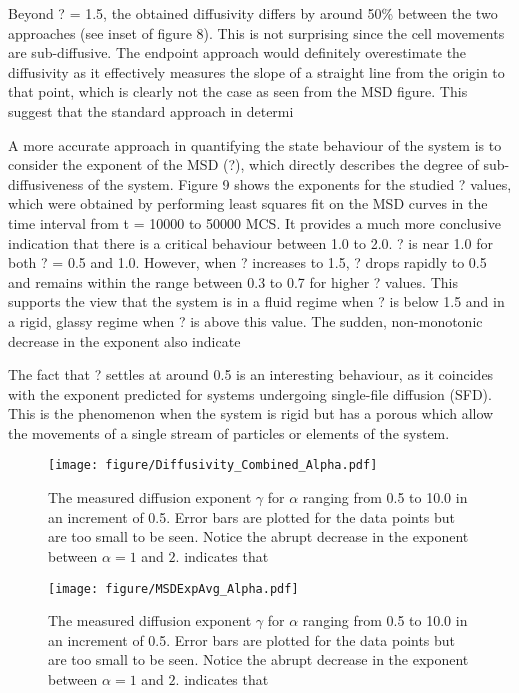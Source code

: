 \documentclass[a4paper,12pt]{article}
\begin{document}
Beyond ? = 1.5, the obtained diffusivity differs by around 50\% between the two approaches (see inset of figure 8). This is not surprising since the cell movements are sub-diffusive. The endpoint approach would definitely overestimate the diffusivity as it effectively measures the slope of a straight line from the origin to that point, which is clearly not the case as seen from the MSD figure. This suggest that the standard approach in determi

A more accurate approach in quantifying the state behaviour of the system is to consider the exponent of the MSD (?), which directly describes the degree of sub-diffusiveness of the system. Figure 9 shows the exponents for the studied ? values, which were obtained by performing least squares fit on the MSD curves in the time interval from t = 10000 to 50000 MCS. It provides a much more conclusive indication that there is a critical behaviour between 1.0 to 2.0. ? is near 1.0 for both ? = 0.5 and 1.0. However, when ? increases to 1.5, ? drops rapidly to 0.5 and remains within the range between 0.3 to 0.7 for higher ? values. This supports the view that the system is in a fluid regime when ? is below 1.5 and in a rigid, glassy regime when ? is above this value. The sudden, non-monotonic decrease in the exponent also indicate 

The fact that ? settles at around 0.5 is an interesting behaviour, as it coincides with the exponent predicted for systems undergoing single-file diffusion (SFD). This is the phenomenon when the system is rigid but has a porous which allow the movements of a single stream of particles or elements of the system. 
\begin{figure}[h]
\centering
\texttt{[image: figure/Diffusivity\_Combined\_Alpha.pdf]}
\caption{The measured diffusion exponent $\gamma$ for $\alpha$ ranging from 0.5 to 10.0 in an increment of 0.5. Error bars are plotted for the data points but are too small to be seen. Notice the abrupt decrease in the exponent between $\alpha = 1$ and $2$.  indicates that }
\end{figure}
\FloatBarrier

\begin{figure}[h]
\centering
\texttt{[image: figure/MSDExpAvg\_Alpha.pdf]}
\caption{The measured diffusion exponent $\gamma$ for $\alpha$ ranging from 0.5 to 10.0 in an increment of 0.5. Error bars are plotted for the data points but are too small to be seen. Notice the abrupt decrease in the exponent between $\alpha = 1$ and $2$.  indicates that }
\end{figure}
\FloatBarrier
\end{document}
